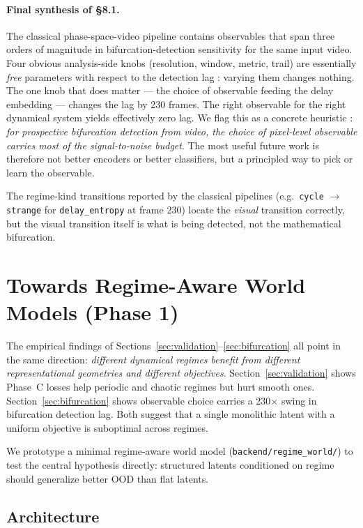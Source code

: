 \documentclass[11pt,a4paper]{article}
\begin{document}
\paragraph{Final synthesis of §8.1.}
The classical phase-space-video pipeline contains observables that
span three orders of magnitude in bifurcation-detection sensitivity
for the same input video. Four obvious analysis-side knobs
(resolution, window, metric, trail) are essentially \emph{free}
parameters with respect to the detection lag : varying them changes
nothing. The one knob that does matter --- the choice of observable
feeding the delay embedding --- changes the lag by 230 frames.
The right observable for the right dynamical system yields effectively
zero lag. We flag this as a concrete heuristic : \emph{for prospective
bifurcation detection from video, the choice of pixel-level
observable carries most of the signal-to-noise budget}. The most
useful future work is therefore not better encoders or better
classifiers, but a principled way to pick or learn the observable.

The regime-kind transitions reported by the classical pipelines (e.g.\
\texttt{cycle} $\to$ \texttt{strange} for \texttt{delay\_entropy} at
frame 230) locate the \emph{visual} transition correctly, but the
visual transition itself is what is being detected, not the
mathematical bifurcation.

\section{Towards Regime-Aware World Models (Phase 1)}
\label{sec:regime-world}

The empirical findings of Sections~\ref{sec:validation}--\ref{sec:bifurcation}
all point in the same direction: \emph{different dynamical regimes
benefit from different representational geometries and different
objectives}. Section~\ref{sec:validation} shows Phase~C losses help
periodic and chaotic regimes but hurt smooth ones. Section~\ref{sec:bifurcation}
shows observable choice carries a 230$\times$ swing in bifurcation
detection lag. Both suggest that a single monolithic latent with a
uniform objective is suboptimal across regimes.

We prototype a minimal regime-aware world model (\verb|backend/regime_world/|)
to test the central hypothesis directly: structured latents conditioned
on regime should generalize better OOD than flat latents.

\subsection{Architecture}
\label{sec:rwm-arch}
\end{document}

